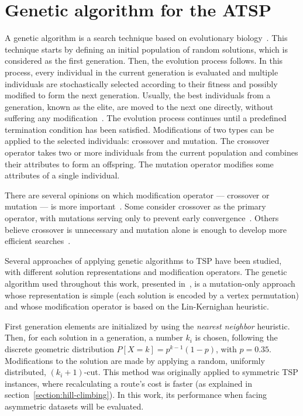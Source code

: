 \newpage
\section{Genetic algorithm for the ATSP}
\label{section:genetic-algorithms}

A genetic algorithm is a search technique based on evolutionary
biology~\citep{Davis91handbookof}. This technique starts by defining an initial
population of random solutions, which is considered as the first generation.
Then, the evolution process follows. In this process, every individual in the
current generation is evaluated and multiple individuals are stochastically
selected according to their fitness and possibly modified to form the next
generation. Usually, the best individuals from a generation, known as the
elite, are moved to the next one directly, without suffering any
modification~\citep{Russel2003}. The evolution process continues until a
predefined termination condition has been satisfied. Modifications  of two
types can be applied to the selected individuals: crossover and mutation. The
crossover operator takes two or more individuals from the current population
and combines their attributes to form an offspring. The mutation operator
modifies some attributes of a single individual.

There are several opinions on which modification operator --- crossover or
mutation --- is more important~\citep{Navy1992}. Some consider crossover as the
primary operator, with mutations serving only to prevent early
convergence~\citep{Holland1992}. Others believe crossover is unnecessary and
mutation alone is enough to develop more efficient searches~\citep{Fogel1990}.

Several approaches of applying genetic algorithms to TSP have been studied,
with different solution representations and modification operators. The genetic
algorithm used throughout this work, presented in~\citet{Chatterjee1996},  is a
mutation-only approach whose representation is simple (each solution is encoded
by a vertex permutation) and whose modification operator is based on the
Lin-Kernighan heuristic.

First generation elements are initialized by using the \textit{nearest neighbor}
heuristic. Then, for each solution in a generation, a number $k_i$ is chosen,
following the discrete geometric distribution $P[X = k] = p^{k - 1}(1-p)$, with
$p = 0.35$.  Modifications to the solution are made by applying a random,
uniformly distributed, $(k_i + 1)$-cut. This method was originally applied to
symmetric TSP instances, where recalculating a route's cost is faster (as
explained in section~\ref{section:hill-climbing}). In this work, its performance
when facing asymmetric datasets will be evaluated.

